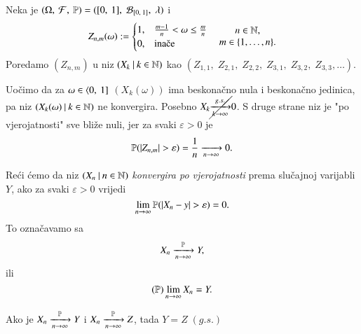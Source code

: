 \begin{pr}  \label{pr:11.13}
    Neka je $(\Omega, \: \mathcal{F}, \: \mathbb{P}) = ([{0}, \:{1}], \; \mathcal{B}_{[{0}, \:{1}]}, \; \lambda)$ i
    \begin{equation*}
        Z_{n, m} (\omega) :=
        \begin{cases}
            1, &\frac{m-1}{n} < \omega \leq \frac{m}{n}\\
            0, &\textnormal{ina\v ce}
        \end{cases}
        \quad
        \begin{matrix}
            n \in \nat,\\
            m \in \{ 1, \ldots, n \}.
        \end{matrix}
    \end{equation*}
    Poredamo $(Z_{n, m})$ u niz $({X_k} \: | \: {k \in \mathbb{N}})$ kao $(Z_{1,1}, \; Z_{2,1}, \; Z_{2, 2}, \; Z_{3,1}, \; Z_{3,2}, \; Z_{3,3}, \ldots)$.

    Uo\v cimo da za $\omega \in \langle {0}, \: {1}]$ $(X_k (\omega))$ ima beskona\v cno nula i beskona\v cno jedinica, pa niz $({X_k (\omega)} \: | \: {k \in \mathbb{N}})$ ne konvergira.
    Posebno $X_k \cancel{\xrightarrow[k \to \infty]{g.s.}} 0$.
    S druge strane niz je "po vjerojatnosti" sve bli\v ze nuli, jer za svaki $\varepsilon > 0$ je
    \begin{equation*}
        \mathbb{P}({|Z_{n, m}| > \varepsilon}) = \frac{1}{n} \xrightarrow[n \to \infty]{} 0.
    \end{equation*} 
\end{pr}

\begin{defn}    \label{defn:11.13-1}
    Re\' ci \' cemo da niz $({X_n} \: | \: {n \in \mathbb{N}})$ \emph{konvergira po vjerojatnosti} prema slu\v cajnoj varijabli $Y$, ako za svaki $\varepsilon > 0$ vrijedi
    \begin{equation*}
        \lim\limits_{n \to \infty} \mathbb{P}({|X_n - y| > \varepsilon}) = 0.
    \end{equation*}
    To ozna\v cavamo sa
    \begin{equation*}
        X_n \xrightarrow[n \to \infty]{\mathbb{P}} Y,
    \end{equation*}
    ili
    \begin{equation*}
        (\mathbb{P}) \lim\limits_{n \to \infty} X_n = Y.
    \end{equation*}
\end{defn}

\begin{zad} \label{zad:11.14}
    Ako je $X_n \xrightarrow[n \to \infty]{\mathbb{P}} Y$ i $X_n \xrightarrow[n \to \infty]{\mathbb{P}} Z$, tada $Y =  Z \; (g.s.)$
\end{zad}

